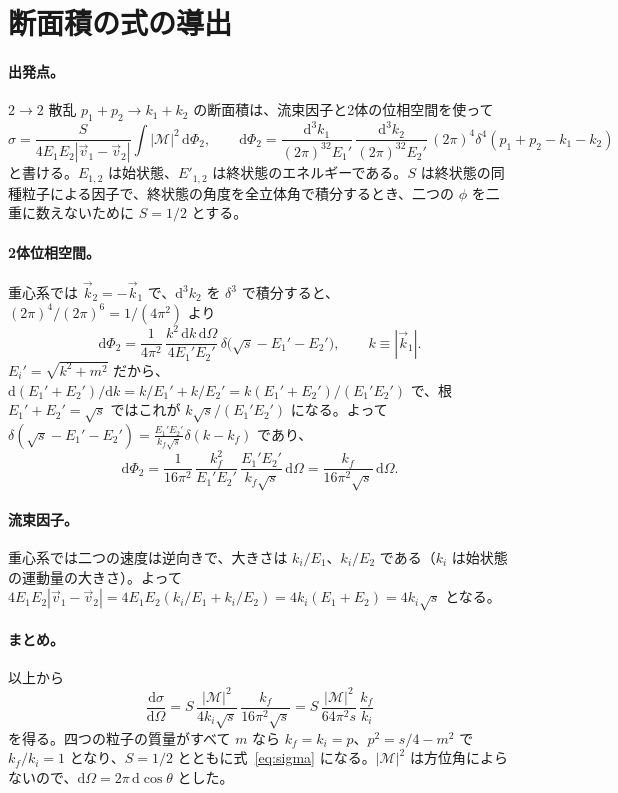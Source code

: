 \documentclass[a4paper,10pt]{ltjsarticle}
\newcommand{\dd}{\mathrm{d}}
\begin{document}
\section{断面積の式の導出}\label{app:xsec}

\paragraph{出発点。}$2\to2$ 散乱 $p_1+p_2\to k_1+k_2$ の断面積は、流束因子と2体の位相空間を使って
\begin{equation*}
\sigma=\frac{S}{4E_1E_2|\vec v_1-\vec v_2|}\int|\mathcal{M}|^2\,\dd\Phi_2,\qquad
\dd\Phi_2=\frac{\dd^3k_1}{(2\pi)^32E_1'}\,\frac{\dd^3k_2}{(2\pi)^32E_2'}\,(2\pi)^4\delta^4(p_1+p_2-k_1-k_2)
\end{equation*}
と書ける。$E_{1,2}$ は始状態、$E'_{1,2}$ は終状態のエネルギーである。$S$ は終状態の同種粒子による因子で、終状態の角度を全立体角で積分するとき、二つの $\phi$ を二重に数えないために $S=1/2$ とする。

\paragraph{2体位相空間。}重心系では $\vec k_2=-\vec k_1$ で、$\dd^3k_2$ を $\delta^3$ で積分すると、$(2\pi)^4/(2\pi)^6=1/(4\pi^2)$ より
\begin{equation*}
\dd\Phi_2=\frac{1}{4\pi^2}\,\frac{k^2\,\dd k\,\dd\Omega}{4E_1'E_2'}\,\delta\bigl(\sqrt{s}-E_1'-E_2'\bigr),\qquad k\equiv|\vec k_1| .
\end{equation*}
$E_i'=\sqrt{k^2+m^2}$ だから、$\dd(E_1'+E_2')/\dd k=k/E_1'+k/E_2'=k(E_1'+E_2')/(E_1'E_2')$ で、根 $E_1'+E_2'=\sqrt{s}$ ではこれが $k\sqrt{s}/(E_1'E_2')$ になる。よって $\delta(\sqrt s-E_1'-E_2')=\frac{E_1'E_2'}{k_f\sqrt s}\delta(k-k_f)$ であり、
\begin{equation*}
\dd\Phi_2=\frac{1}{16\pi^2}\,\frac{k_f^2}{E_1'E_2'}\,\frac{E_1'E_2'}{k_f\sqrt s}\,\dd\Omega=\frac{k_f}{16\pi^2\sqrt s}\,\dd\Omega .
\end{equation*}

\paragraph{流束因子。}重心系では二つの速度は逆向きで、大きさは $k_i/E_1$、$k_i/E_2$ である（$k_i$ は始状態の運動量の大きさ）。よって $4E_1E_2|\vec v_1-\vec v_2|=4E_1E_2(k_i/E_1+k_i/E_2)=4k_i(E_1+E_2)=4k_i\sqrt s$ となる。

\paragraph{まとめ。}以上から
\begin{equation*}
\frac{\dd\sigma}{\dd\Omega}=S\,\frac{|\mathcal{M}|^2}{4k_i\sqrt s}\,\frac{k_f}{16\pi^2\sqrt s}=S\,\frac{|\mathcal{M}|^2}{64\pi^2s}\,\frac{k_f}{k_i}
\end{equation*}
を得る。四つの粒子の質量がすべて $m$ なら $k_f=k_i=p$、$p^2=s/4-m^2$ で $k_f/k_i=1$ となり、$S=1/2$ とともに式~\eqref{eq:sigma} になる。$|\mathcal{M}|^2$ は方位角によらないので、$\dd\Omega=2\pi\,\dd\!\cos\theta$ とした。
\end{document}
